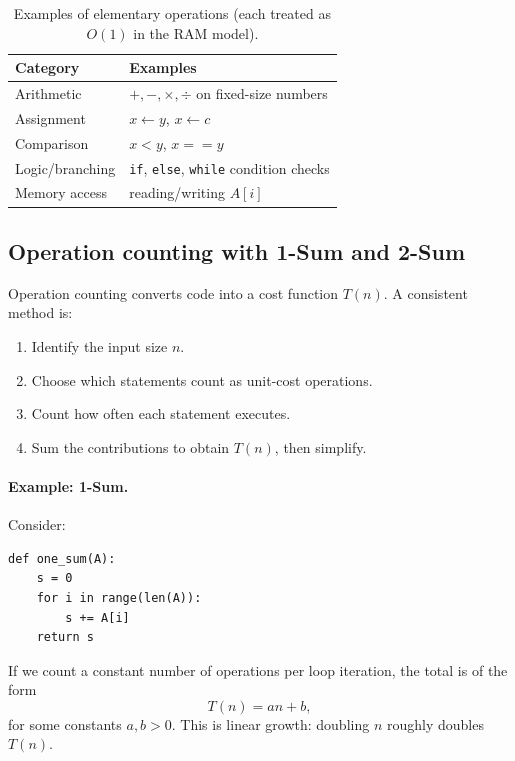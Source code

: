 \documentclass[12pt]{scrartcl}
\begin{document}
\begin{table}[h]
	\centering
	\caption{Examples of elementary operations (each treated as \(O(1)\) in the RAM model).}
	\begin{tabular}{@{}p{} p{}@{}}
		\toprule
		Category        & Examples                                                    \\ \midrule
		Arithmetic      & \(+,-,\times,\div\) on fixed-size numbers                   \\
		Assignment      & \(x \leftarrow y\), \(x \leftarrow c\)                      \\
		Comparison      & \(x<y\), \(x==y\)                                           \\
		Logic/branching & \texttt{if}, \texttt{else}, \texttt{while} condition checks \\
		Memory access   & reading/writing \(A[i]\)                                    \\
		\bottomrule
	\end{tabular}
\end{table}

\subsection{Operation counting with 1-Sum and 2-Sum}
Operation counting converts code into a cost function \(T(n)\). A consistent method is:
\begin{enumerate}[leftmargin=1.5em]
	\item Identify the input size \(n\).
	\item Choose which statements count as unit-cost operations.
	\item Count how often each statement executes.
	\item Sum the contributions to obtain \(T(n)\), then simplify.
\end{enumerate}

\paragraph{Example: 1-Sum.}
Consider:
\begin{lstlisting}
def one_sum(A):
    s = 0
    for i in range(len(A)):
        s += A[i]
    return s
\end{lstlisting}

If we count a constant number of operations per loop iteration, the total is of the form
\[
	T(n)=an+b,
\]
for some constants \(a,b>0\). This is linear growth: doubling \(n\) roughly doubles \(T(n)\).
\end{document}
